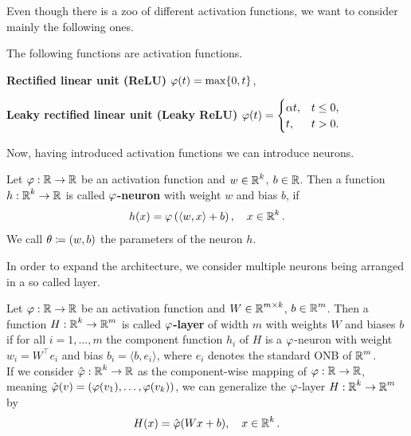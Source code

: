 Even though there is a zoo of different activation functions, we want to consider mainly the following ones.

\begin{example}
The following functions are activation functions.
\begin{mydescription}{}
\item[\textbf{Rectified linear unit (ReLU)}] $\operatorname{\varphi}(t) = \max\{0, t\}$,
\item[\textbf{Leaky rectified linear unit (Leaky ReLU)}] $\displaystyle \operatorname{\varphi}(t) = \begin{cases}
\alpha t, 	& t \leq 0,\\
t,		& t > 0.
\end{cases}$
\end{mydescription}
\end{example}

Now, having introduced activation functions we can introduce neurons.

\begin{definition}
Let $\operatorname{\varphi}: \operatorname{\mathbb{R}} \to \operatorname{\mathbb{R}}$ be an activation function and $w\in \operatorname{\mathbb{R}}^k$, $b \in \operatorname{\mathbb{R}}$. Then a function $h: \operatorname{\mathbb{R}}^k \to \operatorname{\mathbb{R}}$ is called \textbf{$\operatorname{\varphi}$-neuron} with weight $w$ and bias $b$, if
\begin{align}\label{def_neuron}
h(x) = \operatorname{\varphi} \left(\langle w, x \rangle + b \right), \quad x \in \operatorname{\mathbb{R}}^k.
\end{align}
We call $\theta \coloneqq (w, b)$ the parameters of the neuron $h$.
\end{definition}

In order to expand the architecture, we consider multiple neurons being arranged in a so called layer.

\begin{definition}
Let $\operatorname{\varphi}: \operatorname{\mathbb{R}} \to \operatorname{\mathbb{R}}$ be an activation function and $W \in \operatorname{\mathbb{R}}^{m\times k}$, $b\in \operatorname{\mathbb{R}}^m$. Then a function $H:\operatorname{\mathbb{R}}^k \to \operatorname{\mathbb{R}}^m$ is called \textbf{$\operatorname{\varphi}$-layer} of width $m$ with weights $W$ and biases $b$ if for all $i=1,\ldots,m$ the component function $h_i$ of $H$ is a $\operatorname{\varphi}$-neuron with weight $w_i = W^\top e_i$ and bias $b_i = \langle b, e_i \rangle$, where $e_i$ denotes the standard ONB of $\operatorname{\mathbb{R}}^m$.\\
If we consider $\hat{\operatorname{\varphi}}: \operatorname{\mathbb{R}}^k \to \operatorname{\mathbb{R}}$ as the component-wise mapping of $\operatorname{\varphi}:\operatorname{\mathbb{R}}\to \operatorname{\mathbb{R}}$, meaning $\hat{\operatorname{\varphi}}(v) = (\operatorname{\varphi}(v_1), \ldots, \operatorname{\varphi}(v_k))$, we can generalize the $\operatorname{\varphi}$-layer $H:\operatorname{\mathbb{R}}^k \to \operatorname{\mathbb{R}}^m$ by
\begin{align}
H(x) = \hat{\operatorname{\varphi}}(Wx + b), \quad x \in \operatorname{\mathbb{R}} ^k.
\end{align}
\end{definition}

